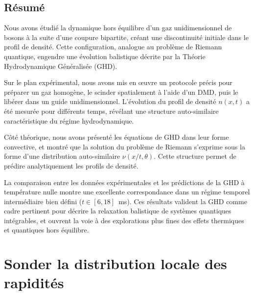 \subsection*{Résumé}

Nous avons étudié la dynamique hors équilibre d’un gaz unidimensionnel de bosons à la suite d’une coupure bipartite, créant une discontinuité initiale dans le profil de densité. Cette configuration, analogue au problème de Riemann quantique, engendre une évolution balistique décrite par la Théorie Hydrodynamique Généralisée (GHD).

Sur le plan expérimental, nous avons mis en œuvre un protocole précis pour préparer un gaz homogène, le scinder spatialement à l’aide d’un DMD, puis le libérer dans un guide unidimensionnel. L’évolution du profil de densité $n(x,t)$ a été mesurée pour différents temps, révélant une structure auto-similaire caractéristique du régime hydrodynamique.

Côté théorique, nous avons présenté les équations de GHD dans leur forme convective, et montré que la solution du problème de Riemann s’exprime sous la forme d’une distribution auto-similaire $\nu(x/t, \theta)$. Cette structure permet de prédire analytiquement les profils de densité.

La comparaison entre les données expérimentales et les prédictions de la GHD à température nulle montre une excellente correspondance dans un régime temporel intermédiaire bien défini ($t \in [6,18]$~ms). Ces résultats valident la GHD comme cadre pertinent pour décrire la relaxation balistique de systèmes quantiques intégrables, et ouvrent la voie à des explorations plus fines des effets thermiques et quantiques hors équilibre.



\section{Sonder la distribution locale des rapidités}
\label{sec:local}

%


